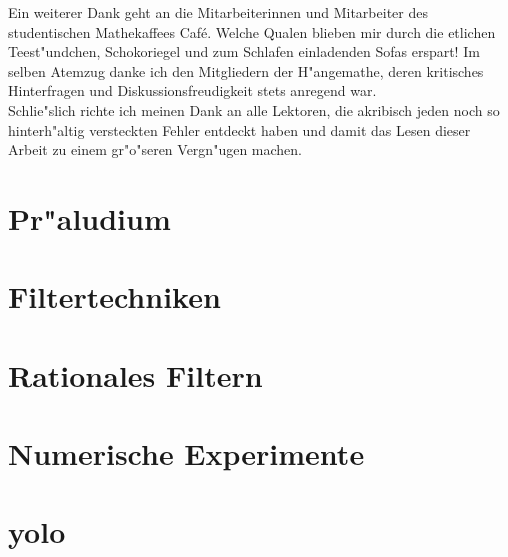 \documentclass[11pt, twoside]{report} %
\begin{document}
Ein weiterer Dank geht an die Mitarbeiterinnen und Mitarbeiter des studentischen Mathekaffees  Caf\'e\grqq. Welche Qualen blieben mir durch
die etlichen Teest"undchen, Schokoriegel und zum Schlafen einladenden Sofas erspart! Im selben Atemzug
danke ich den Mitgliedern der \glqq H"angemathe\grqq, deren kritisches Hinterfragen und Diskussionsfreudigkeit stets anregend war.\\

Schlie"slich richte ich meinen Dank an alle Lektoren, die akribisch jeden noch so hinterh"altig versteckten
Fehler entdeckt haben und damit das Lesen dieser Arbeit zu einem gr"o"seren Vergn"ugen machen.\\

\tableofcontents

\chapter{Pr"aludium}%


\chapter{Filtertechniken} %


\chapter{Rationales Filtern}%


\chapter{Numerische Experimente}


%

\appendix
\chapter{yolo}


\nocite{*}
\printbibliography
\end{document}
